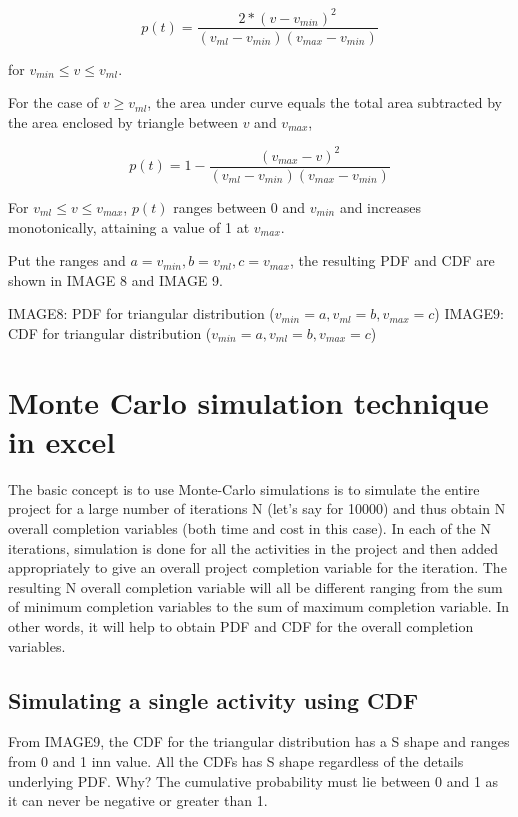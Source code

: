 \begin{equation}
p(t)  = \frac{2* (v - v_{min})^{2}}{ (v_{ml} - v_{min}) (v_{max} - v_{min}) } 
\label{eqn8}
\end{equation}

for $ v_{min} \leqslant v \leqslant v_{ml}$.

For the case of $ v \geqslant v_{ml}$, the area under curve equals the total area subtracted by the area enclosed by triangle between $v$ and $v_{max}$,

\begin{equation}
p(t)  = 1 -  \frac{(v_{max} - v)^{2}}{ (v_{ml} - v_{min}) (v_{max} - v_{min}) } 
\label{eqn9}
\end{equation}

For $ v_{ml} \leqslant v \leqslant v_{max}$, $p(t)$ ranges between 0 and $v_{min}$ and increases monotonically, attaining a value of 1 at $v_{max}$. 

Put the ranges and $ a = v_{min}, b = v_{ml}, c = v_{max}$, the resulting PDF and CDF are shown in IMAGE 8 and IMAGE 9.

IMAGE8: PDF for triangular distribution ($v_{min} = a,  v_{ml} = b , v_{max} =c$)
IMAGE9: CDF for triangular distribution ($v_{min} = a,  v_{ml} = b , v_{max} =c$)

\section{Monte Carlo simulation technique in excel}

The basic concept is to use Monte-Carlo simulations is to simulate the entire project for a large number of iterations N (let’s say for 10000) and thus obtain N overall completion variables (both time and cost in this case). In each of the N iterations, simulation is done for all the activities in the project and then added appropriately to give an overall project completion variable for the iteration. The resulting N overall completion variable will all be different ranging from the sum of minimum completion variables to the sum of maximum completion variable. In other words, it will help to obtain PDF and CDF for the overall completion variables.


\subsection{Simulating a single activity using CDF}
\label{4.5.1}
From IMAGE9, the CDF for the triangular distribution has a S shape and ranges from 0 and 1 inn value. All the CDFs has S shape regardless of the details underlying PDF.
Why?
The cumulative probability must lie between 0 and 1 as it can never be negative or greater than 1.

